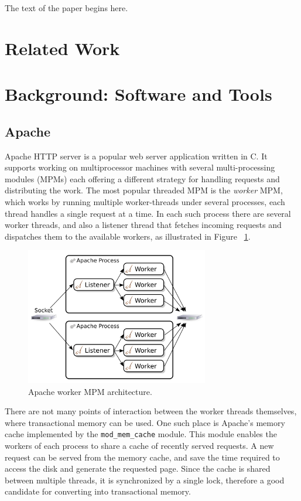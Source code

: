 \documentclass[preprint,natbib,11pt]{sigplanconf}
\begin{document}
The text of the paper begins here.
\section{Related Work}
\section{Background: Software and Tools}
\subsection{Apache}
Apache\cite{apache} HTTP server is a popular web server application written in
C. It supports working on multiprocessor machines with several multi-processing
modules (MPMs) each offering a different strategy for handling requests and
distributing the work. The most popular threaded MPM is the \emph{worker} MPM,
which works by running multiple worker-threads under several processes, each
thread handles a single request at a time. In each such process there are
several worker threads, and also a listener thread that fetches incoming
requests and dispatches them to the available workers, as illustrated in Figure
~\ref{fig:apache-worker-MPM}.

\begin{figure}
 \begin{center}
  \includegraphics[width=8cm]{Apache-Worker-MPM.png}
 \end{center}
 \caption{Apache worker MPM architecture.}
 \label{fig:apache-worker-MPM}
\end{figure}

There are not many points of interaction between the worker threads themselves,
where transactional memory can be used. One such place is Apache's memory cache
implemented by the {\tt mod\_mem\_cache}\cite{apache:mod_mem_cache} module. This
module enables the workers of each process to share a cache of recently served
requests. A new request can be served from the memory cache, and save the time
required to access the disk and generate the requested page. Since the cache is
shared between multiple threads, it is synchronized by a single lock, therefore
a good candidate for converting into transactional memory.
\end{document}
